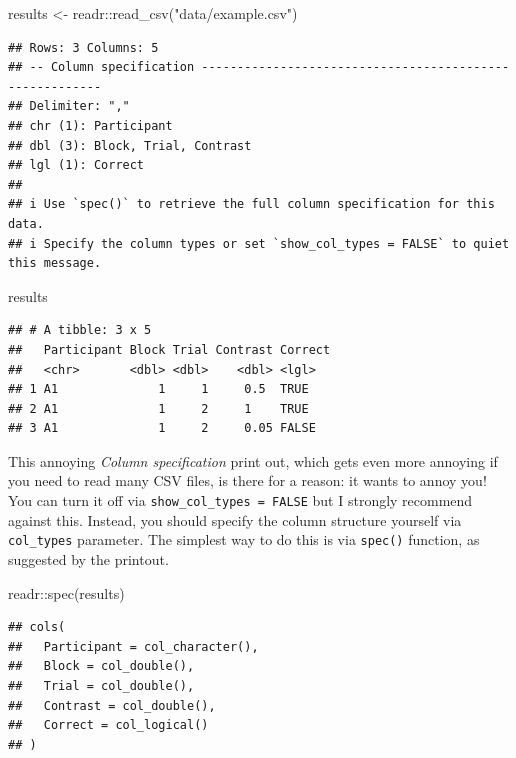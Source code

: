 \documentclass[
]{book}
\newenvironment{Shaded}{\begin{snugshade}}{\end{snugshade}}
\newcommand{\FunctionTok}[1]{\textcolor[rgb]{0.00,0.00,0.00}{#1}}
\newcommand{\NormalTok}[1]{#1}
\newcommand{\OtherTok}[1]{\textcolor[rgb]{0.56,0.35,0.01}{#1}}
\newcommand{\SpecialCharTok}[1]{\textcolor[rgb]{0.00,0.00,0.00}{#1}}
\newcommand{\StringTok}[1]{\textcolor[rgb]{0.31,0.60,0.02}{#1}}
\begin{document}
\begin{Shaded}
\begin{Highlighting}[]
\NormalTok{results }\OtherTok{\textless{}{-}}\NormalTok{ readr}\SpecialCharTok{::}\FunctionTok{read\_csv}\NormalTok{(}\StringTok{"data/example.csv"}\NormalTok{)}
\end{Highlighting}
\end{Shaded}

\begin{verbatim}
## Rows: 3 Columns: 5
## -- Column specification --------------------------------------------------------
## Delimiter: ","
## chr (1): Participant
## dbl (3): Block, Trial, Contrast
## lgl (1): Correct
## 
## i Use `spec()` to retrieve the full column specification for this data.
## i Specify the column types or set `show_col_types = FALSE` to quiet this message.
\end{verbatim}

\begin{Shaded}
\begin{Highlighting}[]
\NormalTok{results}
\end{Highlighting}
\end{Shaded}

\begin{verbatim}
## # A tibble: 3 x 5
##   Participant Block Trial Contrast Correct
##   <chr>       <dbl> <dbl>    <dbl> <lgl>  
## 1 A1              1     1     0.5  TRUE   
## 2 A1              1     2     1    TRUE   
## 3 A1              1     2     0.05 FALSE
\end{verbatim}

This annoying \emph{Column specification} print out, which gets even more annoying if you need to read many CSV files, is there for a reason: it wants to annoy you! You can turn it off via \texttt{show\_col\_types\ =\ FALSE} but I strongly recommend against this. Instead, you should specify the column structure yourself via \texttt{col\_types} parameter. The simplest way to do this is via \texttt{spec()} function, as suggested by the printout.

\begin{Shaded}
\begin{Highlighting}[]
\NormalTok{readr}\SpecialCharTok{::}\FunctionTok{spec}\NormalTok{(results)}
\end{Highlighting}
\end{Shaded}

\begin{verbatim}
## cols(
##   Participant = col_character(),
##   Block = col_double(),
##   Trial = col_double(),
##   Contrast = col_double(),
##   Correct = col_logical()
## )
\end{verbatim}
\end{document}

